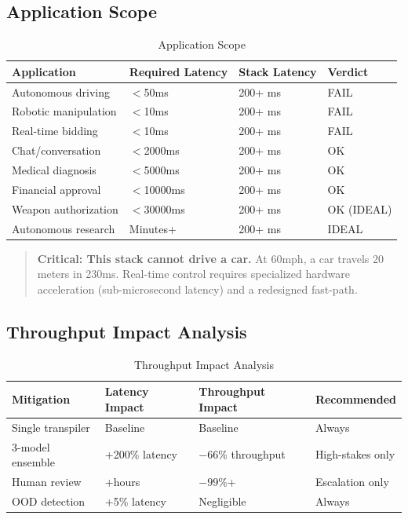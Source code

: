 \documentclass[11pt,letterpaper]{article}
\theoremstyle{definition}
\theoremstyle{remark}
\begin{document}
\subsection{Application Scope}

\begin{table}[h]
\centering
\begin{tabular}{@{}llll@{}}
\toprule
\textbf{Application} & \textbf{Required Latency} & \textbf{Stack Latency} & \textbf{Verdict} \\
\midrule
Autonomous driving & $<$50ms & 200+ ms & FAIL \\
Robotic manipulation & $<$10ms & 200+ ms & FAIL \\
Real-time bidding & $<$10ms & 200+ ms & FAIL \\
Chat/conversation & $<$2000ms & 200+ ms & OK \\
Medical diagnosis & $<$5000ms & 200+ ms & OK \\
Financial approval & $<$10000ms & 200+ ms & OK \\
Weapon authorization & $<$30000ms & 200+ ms & OK (IDEAL) \\
Autonomous research & Minutes+ & 200+ ms & IDEAL \\
\bottomrule
\end{tabular}
\caption{Application Scope}
\end{table}

\begin{quote}
\textbf{Critical: This stack cannot drive a car.} At 60mph, a car travels 20 meters in 230ms. Real-time control requires specialized hardware acceleration (sub-microsecond latency) and a redesigned fast-path.
\end{quote}

\subsection{Throughput Impact Analysis}

\begin{table}[h]
\centering
\begin{tabular}{@{}llll@{}}
\toprule
\textbf{Mitigation} & \textbf{Latency Impact} & \textbf{Throughput Impact} & \textbf{Recommended} \\
\midrule
Single transpiler & Baseline & Baseline & Always \\
3-model ensemble & +200\% latency & $-66$\% throughput & High-stakes only \\
Human review & +hours & $-99$\%+ & Escalation only \\
OOD detection & +5\% latency & Negligible & Always \\
\bottomrule
\end{tabular}
\caption{Throughput Impact Analysis}
\end{table}
\end{document}
